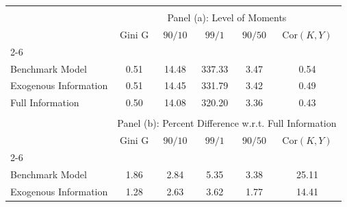 \def\sym#1{\ifmmode^{#1}\else\(^{#1}\)\fi}
{\centering
\begin{tabular*}{\textwidth}{@{\extracolsep{\fill}} l c c c c c}
\hline\hline\\[-1.8ex]
& \multicolumn{5}{c}{Panel (a): Level of Moments}\\
 & Gini G& $90/10$ & $99/1$ & $90/50$  &$\text{Cor}(K,Y )$ \\
\cline{2-6} \\[-1.8ex]
Benchmark Model & 0.51 & 14.48 & 337.33 & 3.47 & 0.54\\ 
[1em] Exogenous Information & 0.51 & 14.45 & 331.79 & 3.42 & 0.49\\ 
[1em] Full  Information & 0.50 & 14.08 & 320.20 & 3.36 & 0.43\\ 
\hline
&&&\\
& \multicolumn{5}{c}{Panel (b): Percent  Difference w.r.t. Full Information} \\ 
 & Gini G& $90/10$ & $99/1$ & $90/50$  &$\text{Cor}(K,Y )$  \\
\cline{2-6} \\[-1.8ex]
Benchmark Model & 1.86 & 2.84 & 5.35 & 3.38 & 25.11\\ 
[1em] Exogenous Information & 1.28 & 2.63 & 3.62 & 1.77 & 14.41\\ 
\hline
\hline
\end{tabular*}\par}